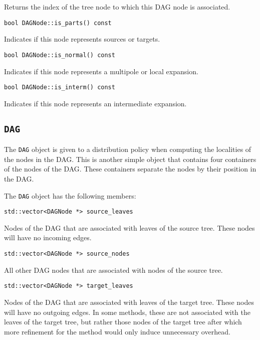 \noindent Returns the index of the tree node to which this DAG node is
associated.

\begin{lstlisting}
bool DAGNode::is_parts() const
\end{lstlisting}

\noindent Indicates if this node represents sources or targets.

\begin{lstlisting}
bool DAGNode::is_normal() const
\end{lstlisting}

\noindent Indicates if this node represents a multipole or local expansion.

\begin{lstlisting}
bool DAGNode::is_interm() const
\end{lstlisting}

\noindent Indicates if this node represents an intermediate expansion.


\subsection{\texttt{DAG}}

The \texttt{DAG} object is given to a distribution policy when computing the
localities of the nodes in the DAG. This is another simple object that contains
four containers of the nodes of the DAG. These containers separate the nodes
by their position in the DAG.

The \texttt{DAG} object has the following members:

\begin{lstlisting}
std::vector<DAGNode *> source_leaves
\end{lstlisting}

\noindent Nodes of the DAG that are associated with leaves of the source tree.
These nodes will have no incoming edges.

\begin{lstlisting}
std::vector<DAGNode *> source_nodes
\end{lstlisting}

\noindent All other DAG nodes that are associated with nodes of the source tree.

\begin{lstlisting}
std::vector<DAGNode *> target_leaves
\end{lstlisting}

\noindent Nodes of the DAG that are associated with leaves of the target tree.
These nodes will have no outgoing edges. In some methods, these are not
associated with the leaves of the target tree, but rather those nodes of the
target tree after which more refinement for the method would only induce
unnecessary overhead.

